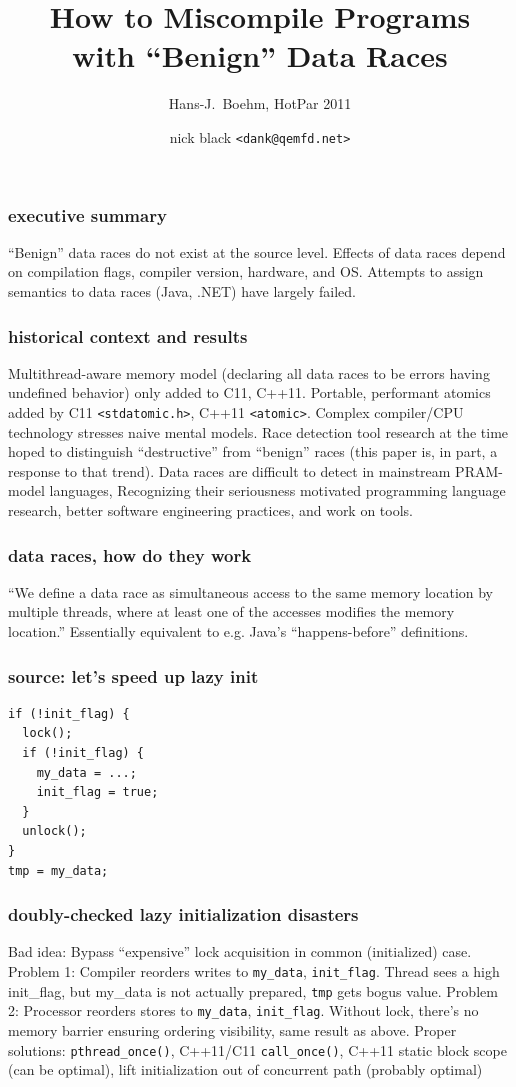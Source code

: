 \documentclass{beamer}
\title{How to Miscompile Programs\\ with ``Benign'' Data Races}
\subtitle{Hans-J.\ Boehm, HotPar 2011}
\author{nick black {\texttt{<dank@qemfd.net>}}}
\institute{Atlanta PWL \#09, 2018-10-09}
\date{}
\begin{document}
\begin{frame}
\titlepage
\end{frame}

\begin{frame}
\frametitle{executive summary}
``Benign'' data races do not exist at the source level.
\vfill
Effects of data races depend on compilation flags, compiler version, hardware,
and OS.
\vfill
Attempts to assign semantics to data races (Java, .NET) have largely failed.
\end{frame}

\begin{frame}
\frametitle{historical context and results}
Multithread-aware memory model (declaring all data races to be errors having undefined behavior) only added to C11, C++11.
\vfill
Portable, performant atomics added by C11 \texttt{<stdatomic.h>}, C++11 \texttt{<atomic>}.
\vfill
Complex compiler/CPU technology stresses naive mental models.
\vfill
Race detection tool research at the time hoped to distinguish ``destructive'' from ``benign'' races (this paper is, in part, a response to that trend).
\vfill
Data races are difficult to detect in mainstream PRAM-model languages, Recognizing their seriousness motivated programming language research, better software engineering practices, and work on tools.
\end{frame}

\begin{frame}
\frametitle{data races, how do they work}
``We define a data race as simultaneous access to the same
memory location by multiple threads, where at least one
of the accesses modifies the memory location.''
\vfill
Essentially equivalent to e.g. Java's ``happens-before'' definitions.
\end{frame}

\begin{frame}[fragile]
\frametitle{source: let's speed up lazy init}
\begin{lstlisting}
if (!init_flag) {
  lock();
  if (!init_flag) {
    my_data = ...;
    init_flag = true;
  }
  unlock();
}
tmp = my_data;
\end{lstlisting}
\end{frame}

\begin{frame}
\frametitle{doubly-checked lazy initialization disasters}
Bad idea: Bypass ``expensive'' lock acquisition in common (initialized) case.
\vfill
Problem 1: Compiler reorders writes to \texttt{my\_data}, \texttt{init\_flag}. Thread sees a high init\_flag, but my\_data is not actually prepared, \texttt{tmp} gets bogus value.
\vfill
Problem 2: Processor reorders stores to \texttt{my\_data}, \texttt{init\_flag}. Without lock, there's no memory barrier ensuring ordering visibility, same result as above.
\vfill
Proper solutions: {\texttt{pthread\_once()}}, C++11/C11 \texttt{call\_once()}, C++11 static block scope (can be optimal), lift initialization out of concurrent path (probably optimal)
\end{frame}
\end{document}
